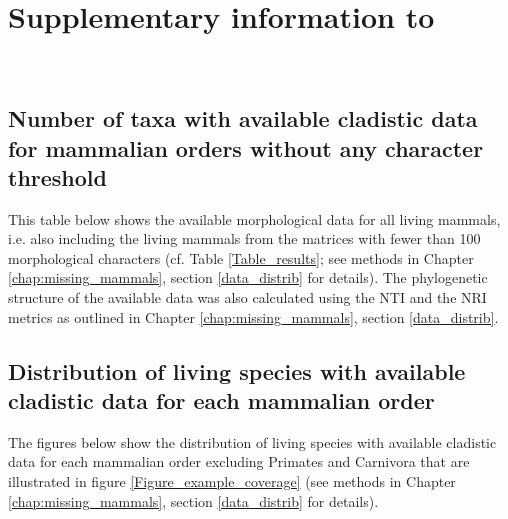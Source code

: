 %
%

\chapter{Supplementary information to }

\label{chap:Appendix_missing_mammals}

\bigskip
\medskip
\begin{center}

 \\
\bigskip
\end{center}

\section{Number of taxa with available cladistic data for mammalian orders without any character threshold}
This table below shows the available morphological data for all living mammals, i.e. also including the living mammals from the matrices with fewer than 100 morphological characters (cf. Table \ref{Table_results}; see methods in Chapter \ref{chap:missing_mammals}, section \ref{data_distrib} for details).
The phylogenetic structure of the available data was also calculated using the NTI and the NRI metrics as outlined in Chapter \ref{chap:missing_mammals}, section \ref{data_distrib}.



\section{Distribution of living species with available cladistic data for each mammalian order}

The figures below show the distribution of living species with available cladistic data for each mammalian order excluding Primates and Carnivora that are illustrated in figure \ref{Figure_example_coverage} (see methods in Chapter \ref{chap:missing_mammals}, section \ref{data_distrib} for details).

